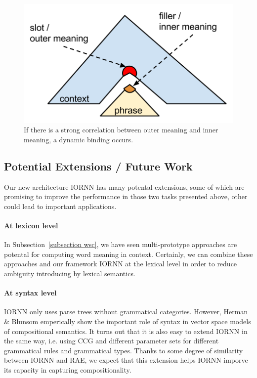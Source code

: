 \documentclass[11pt]{article}
\begin{document}
\begin{figure}[h!]
	\center
	\includegraphics[scale=0.5]{Inner_outer.png}
	\caption{If there is a strong correlation between outer meaning and inner meaning, a dynamic
	binding occurs.}
	\label{figure inner outer}
\end{figure}



\subsection{Potential Extensions / Future Work}
\label{subsection future work}

Our new architecture IORNN has many potental extensions, some of which are promising to improve 
the performance in those two tasks presented above, other could lead to important applications. 

\paragraph{At lexicon level} In Subsection~\ref{subsection wsc}, we 
have seen multi-prototype approaches are potental for computing word meaning in 
context. Certainly, we can combine these approaches and our framework IORNN at the 
lexical level in order to reduce ambiguity introducing by lexical semantics. 

\paragraph{At syntax level} IORNN only uses parse trees without grammatical categories. However, 
Herman \& Blunsom emperically show the important role of syntax in vector space models of 
compositional semantics. It turns out that it is also easy to extend IORNN in the same way, 
i.e. using CCG and different parameter sets for different 
grammatical rules and grammatical types. Thanks to some degree of similarity between IORNN and 
RAE, we expect that this extension helps IORNN imporve its capacity in capturing compositionality.
\end{document}
